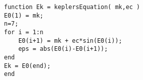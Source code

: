 \begin{verbatim}
function Ek = keplersEquation( mk,ec )
E0(1) = mk;
n=7;
for i = 1:n
    E0(i+1) = mk + ec*sin(E0(i));
    eps = abs(E0(i)-E0(i+1));
end
Ek = E0(end);
end
\end{verbatim}
